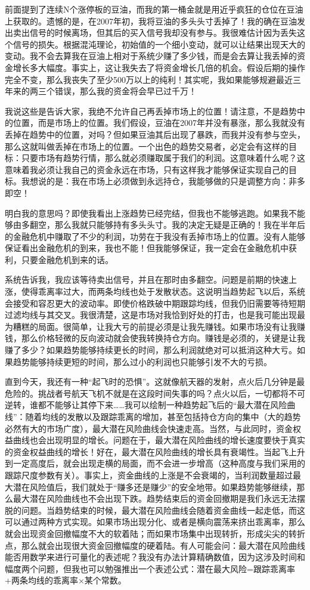 前面提到了连续N个涨停板的豆油，而我的第一桶金就是用近乎疯狂的仓位在豆油上获取的。遗憾的是，在2007年初，我将豆油的多头头寸丢掉了！我的确在豆油发出卖出信号的时候离场，但其后的买入信号我却没有参与。我很难估计因为丢失这个信号的损失。根据混沌理论，初始值的一个细小变动，就可以让结果出现天大的变动。我不会去算我在豆油上相对于系统少赚了多少钱，而是会去算让我丢掉的资金增长多大幅度。事实上，这让我失去了将资金增长几倍的机会。假设后期的操作完全不变，那么我丧失了至少500万以上的纯利！其实呢，我如果能够规避最近三年来的两三个错误，那么我的资金将会早已过千万！

我说这些是告诉大家，我绝不允许自己再丢掉市场上的位置！请注意，不是趋势中的位置，而是市场上的位置。我们假设，豆油在2007年并没有暴涨，那么我就没有丢掉在趋势中的位置，对吗？但如果豆油其后出现了暴跌，而我并没有参与空头，那么这就叫做丢掉在市场上的位置。一个出色的趋势交易者，必定会有这样的目标：只要市场有趋势行情，那么就必须赚取属于我们的利润。这意味着什么呢？这意味着我必须让我自己的资金永远在市场，只有这样我才能够保证实现自己的目标。我想说的是：我在市场上必须做到永远持仓，我能够做的只是调整方向：非多即空！

明白我的意思吗？即使我看出上涨趋势已经完结，但我也不能够逃跑。如果我不能够由多翻空，那么我就只能够持有多头头寸。我的决定无疑是正确的！我在半年后的金融危机中赚取了不少的利润，功劳在于我没有丢掉市场上的位置。没有人能够保证看出金融危机的到来，我也不能！但我能够保证，我一定会在金融危机中获利，只要金融危机到来的话。

系统告诉我，我应该等待卖出信号，并且在那时由多翻空。问题是前期的快速上涨，使得乖离率过大，而两条均线也处于发散状态。这说明当趋势起飞以后，系统会接受和容忍更大的波动率。即使价格跌破中期跟踪均线，但我仍旧需要等待短期过滤均线与其交叉。我很清楚，这是市场对我恰到好处的打击，也是我可能出现最为糟糕的局面。很简单，让我大亏的前提必须是让我先赚钱。如果市场没有让我赚钱，那么价格轻微的反向波动就会使我转换持仓方向。赚钱是必须的，关键是让我赚了多少？如果趋势能够持续更长的时间，那么利润就绝对可以抵消这种大亏。如果趋势能够持续更短的时间，那么过小的利润也只能够引发不大的亏损。

直到今天，我还有一种“起飞时的恐惧”。这就像航天器的发射，点火后几分钟是最危险的。挑战者号航天飞机不就是在这段时间失事的吗？点火以后，一切都将不可逆转，谁都不能够让其停下来……我可以绘制一种趋势起飞后的“最大潜在风险曲线”：随着均线的发散以及跟踪乖离的增加，甚至包括持仓方向的集中（大的趋势必然有大的市场广度），最大潜在风险曲线会快速走高。当然，与此同时，资金权益曲线也会出现明显的增长。问题在于，最大潜在风险曲线的增长速度要快于真实的资金权益曲线的增长！好在，最大潜在风险曲线的增长具有衰竭性。当起飞上升到一定高度后，就会出现走横的局面，而不会进一步增高（这种高度与我们采用的跟踪尺度参数有关）。事实上，资金曲线的上涨是不会衰竭的，当利润数量超过最大潜在风险值后，我们就处于“赚多还是赚少”的安全地带。如果趋势能够继续，那么最大潜在风险曲线也不会出现下跌。趋势结束后的资金回撤期是我们永远无法摆脱的问题。当趋势结束的时候，最大潜在风险曲线会随着资金曲线一起走低，而这可以通过两种方式实现。如果市场出现分化、或者是横向震荡来挤出乖离率，那么就会出现资金回撤幅度不大的软着陆；而如果市场集中出现转折，形成尖尖的转折点，那么就会出现很大资金回撤幅度的硬着陆。有人可能会问：最大潜在风险曲线能否用数学来进行可量化的表述呢？我没有办法计算精确数值，因为这涉及时间和幅度两个问题，但我也可以勉强推出一个表述公式：潜在最大风险=跟踪乖离率+两条均线的乖离率×某个常数。

